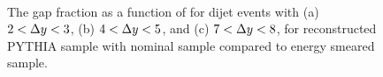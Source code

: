 \begin{figure}
\centering
\mbox{
                              }
\caption[Uncertainty bands due to the JER uncertainty for gap fraction as a function of \qz{}]{
The gap fraction as a function of \qz{} for dijet events with (a) $2<\mbox{$\Delta y$}{}<3$, (b) $4<\mbox{$\Delta y$}{}<5$, and (c) $7<\mbox{$\Delta y$}{}<8$,  for reconstructed PYTHIA sample with nominal sample compared to energy smeared sample.
\label{GBJ2:ResoEnergy:Q0}}
\end{figure}



